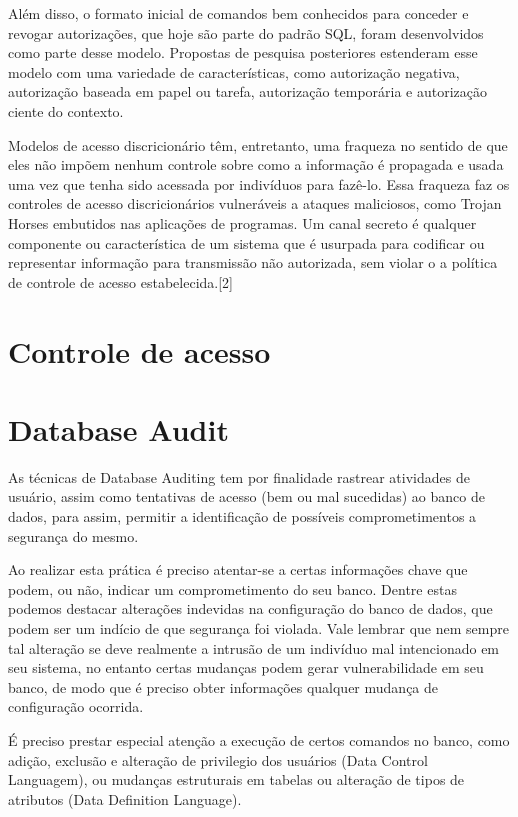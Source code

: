 \documentclass{article}
\begin{document}
Além disso, o formato inicial de comandos bem conhecidos para conceder e revogar autorizações, que hoje são parte do padrão SQL, foram desenvolvidos como parte desse modelo. Propostas de pesquisa posteriores estenderam esse modelo com uma variedade de características, como autorização negativa, autorização baseada em papel ou tarefa, autorização temporária e autorização ciente do contexto.

Modelos de acesso discricionário têm, entretanto, uma fraqueza no sentido de que eles não impõem nenhum controle sobre como a informação é propagada e usada uma vez que tenha sido acessada por indivíduos para fazê-lo. Essa fraqueza faz os controles de acesso discricionários vulneráveis a ataques maliciosos, como Trojan Horses embutidos nas aplicações de programas. Um canal secreto é qualquer componente ou característica de um sistema que é usurpada para codificar ou representar informação para transmissão não autorizada, sem violar o a política de controle de acesso estabelecida.[2]


\section{Controle de acesso}

\section{Database Audit}

As técnicas de Database Auditing tem por finalidade rastrear atividades de usuário, assim como tentativas de acesso (bem ou mal sucedidas) ao banco de dados, para assim, permitir a identificação de possíveis comprometimentos a segurança do mesmo.

Ao realizar esta prática é preciso atentar-se a certas informações chave que podem, ou não, indicar um comprometimento do seu banco. Dentre estas podemos destacar alterações indevidas na configuração do banco de dados, que podem ser um indício de que segurança foi violada. Vale lembrar que nem sempre tal alteração se deve realmente a intrusão de um indivíduo mal intencionado em seu sistema, no entanto certas mudanças podem gerar vulnerabilidade em seu banco, de modo que é preciso obter informações qualquer mudança de configuração ocorrida.

É preciso prestar especial atenção a execução de certos comandos no banco, como adição, exclusão e alteração de privilegio dos usuários (Data Control Languagem), ou  mudanças estruturais em tabelas ou alteração de tipos de atributos (Data Definition Language).
\end{document}
